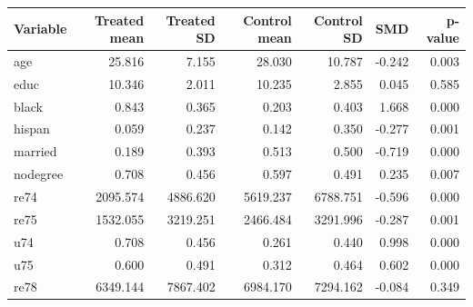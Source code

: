 \begin{tabular}{lrrrrrr}
\toprule
Variable & Treated mean & Treated SD & Control mean & Control SD & SMD & p-value \\
\midrule
age & 25.816 & 7.155 & 28.030 & 10.787 & -0.242 & 0.003 \\
educ & 10.346 & 2.011 & 10.235 & 2.855 & 0.045 & 0.585 \\
black & 0.843 & 0.365 & 0.203 & 0.403 & 1.668 & 0.000 \\
hispan & 0.059 & 0.237 & 0.142 & 0.350 & -0.277 & 0.001 \\
married & 0.189 & 0.393 & 0.513 & 0.500 & -0.719 & 0.000 \\
nodegree & 0.708 & 0.456 & 0.597 & 0.491 & 0.235 & 0.007 \\
re74 & 2095.574 & 4886.620 & 5619.237 & 6788.751 & -0.596 & 0.000 \\
re75 & 1532.055 & 3219.251 & 2466.484 & 3291.996 & -0.287 & 0.001 \\
u74 & 0.708 & 0.456 & 0.261 & 0.440 & 0.998 & 0.000 \\
u75 & 0.600 & 0.491 & 0.312 & 0.464 & 0.602 & 0.000 \\
re78 & 6349.144 & 7867.402 & 6984.170 & 7294.162 & -0.084 & 0.349 \\
\bottomrule
\end{tabular}
